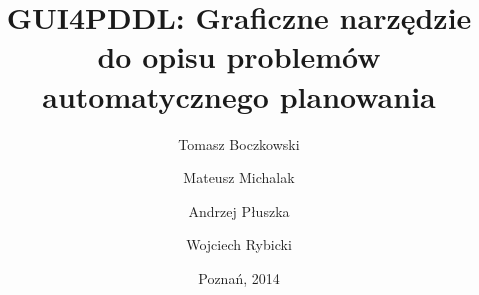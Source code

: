 \documentclass[11pt,a4paper,polish,thesis]{dcsbook}
\begin{document}
\university
\institute
\author{Tomasz Boczkowski \and Mateusz Michalak \and Andrzej Płuszka \and Wojciech Rybicki}
\title{GUI4PDDL: Graficzne narzędzie do opisu problemów automatycznego planowania}
\date{Poznań, 2014}
\maketitle
\frontmatter
\tableofcontents{}

\mainmatter










\appendix


\backmatter

\end{document}
